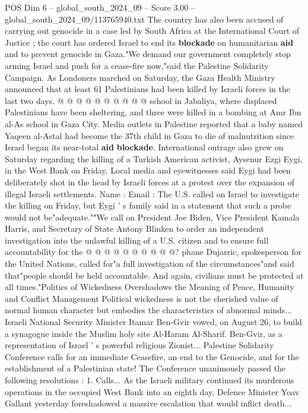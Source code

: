 \begin{textsample}{POS Dim 6 – global\_south\_2024\_09 – Score 3.00 – global\_south\_2024\_09/113765940.txt}
The country has also been accused of carrying out genocide in a case led by South Africa at the International Court of Justice ; the court has ordered Israel to end its \textbf{blockade} on humanitarian \textbf{aid} and to prevent genocide in Gaza."We demand our government completely stop arming Israel and push for a cease-fire now,"said the Palestine Solidarity Campaign.
As Londoners marched on Saturday, the Gaza Health Ministry announced that at least 61 Palestinians had been killed by Israeli forces in the last two days. @ @ @ @ @ @ @ @ @ @ school in Jabaliya, where displaced Palestinians have been sheltering, and three were killed in a bombing at Amr Ibn al-As school in Gaza City.
Media outlets in Palestine reported that a baby named Yaqeen al-Astal had become the 37th child in Gaza to die of malnutrition since Israel began its near-total \textbf{aid} \textbf{blockade}.
International outrage also grew on Saturday regarding the killing of a Turkish American activist, Aysenur Ezgi Eygi, in the West Bank on Friday.
Local media and eyewitnesses said Eygi had been deliberately shot in the head by Israeli forces at a protest over the expansion of illegal Israeli settlements.
Name : Email : The U.S. called on Israel to investigate the killing on Friday, but Eygi ' s family said in a statement that such a probe would not be"adequate.""We call on President Joe Biden, Vice President Kamala Harris, and Secretary of State Antony Blinken to order an independent investigation into the unlawful killing of a U.S. citizen and to ensure full accountability for the @ @ @ @ @ @ @ @ @ @? phane Dujarric, spokesperson for the United Nations, called for"a full investigation of the circumstances"and said that"people should be held accountable.
And again, civilians must be protected at all times."Politics of Wickedness Overshadows the Meaning of Peace, Humanity and Conflict Management Political wickedness is not the cherished value of normal human character but embodies the characteristics of abnormal minds...
Israeli National Security Minister Itamar Ben-Gvir vowed, on August 26, to build a synagogue inside the Muslim holy site Al-Haram Al-Sharif.
Ben-Gvir, as a representation of Israel ' s powerful religious Zionist...
Palestine Solidarity Conference calls for an immediate Ceasefire, an end to the Genocide, and for the establishment of a Palestinian state!
The Conference unanimously passed the following resolutions : 1.
Calls...
As the Israeli military continued its murderous operations in the occupied West Bank into an eighth day, Defence Minister Yoav Gallant yesterday foreshadowed a massive escalation that would inflict death...

\end{textsample}
